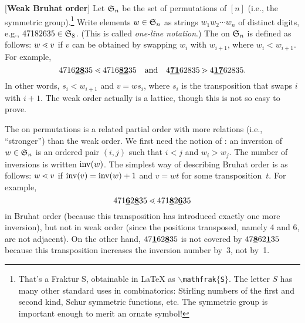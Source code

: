 \begin{example}\label{ex:Bruhat}[\textbf{Weak Bruhat order}]
Let $\mathfrak{S}_n$ be the set of permutations of 
$[n]$ (i.e., the symmetric group).\footnote{That's a Fraktur S, obtainable in LaTeX as {\tt $\backslash$mathfrak$\{$S$\}$}.  The letter $S$ has many other standard uses in combinatorics:
Stirling numbers of the first and second kind, Schur symmetric functions, etc.  The symmetric group is
important enough to merit an ornate symbol!} Write elements $w\in\mathfrak{S}_n$ as strings
$w_1w_2\cdots w_n$ of distinct digits, e.g., $47182635\in\mathfrak{S}_8$.  (This is called \emph{one-line notation}.)
The  on $\mathfrak{S}_n$ is defined as follows:
$w\lessdot v$ if $v$ can be obtained by swapping $w_i$
with $w_{i+1}$, where $w_i<w_{i+1}$.  For example,
\[4716\underline{\bf28}35 \lessdot 4716\underline{\bf82}35 \quad\text{and}\quad 4\underline{\bf71}62835 \gtrdot 4\underline{\bf17}62835.\]
In other words, $s_i<w_{i+1}$ and $v=w s_i$, where $s_i$ is the transposition that swaps $i$ with $i+1$.
The weak order actually is a lattice, though this is not so easy to prove.

The  on permutations is a related partial order with more relations (i.e., ``stronger'') than the weak order.  We first need the notion of : an inversion of $w\in\mathfrak{S}_n$ is an ordered pair $(i,j)$ such that $i<j$ and $w_i>w_j$.  The number of inversions is written $\operatorname{inv}(w)$.  The simplest way of describing Bruhat order is as follows: $w\lessdot v$ if $\operatorname{inv}(v)=\operatorname{inv}(w)+1$ and $v=wt$ for some transposition~$t$.  For example, 
\[471\underline{\bf6}2\underline{\bf8}35 \lessdot 471\underline{\bf8}2\underline{\bf6}35\]
in Bruhat order (because this transposition has introduced exactly one more inversion), but not in weak order (since the positions transposed, namely 4 and 6, are not adjacent).  On the other hand,
$47\underline{\bf1}62\underline{\bf8}35$ is not covered by $47\underline{\bf8}62\underline{\bf1}35$ because this transposition increases the inversion number by~3, not by~1.


\end{example}
